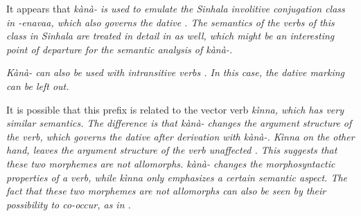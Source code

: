 

It appears that \em kànà- \em is used to emulate the Sinhala involitive conjugation class in \em -enavaa\em, which also governs the dative \citep{Gair1971actioninvolvement}. The semantics of the verbs of this class in Sinhala are treated in detail in \citet{Gair1971actioninvolvement} as well, which might be an interesting point of departure for the semantic analysis of \em kànà-\em.

\em Kànà- \em can also be used with intransitive verbs . In this case, the dative marking can be left out.


It is possible that this prefix is related to the vector verb \em kìnna\em, which has very similar semantics. The difference is that \em kànà- \em changes the argument structure of the verb, which governs the dative after derivation with \em kànà-\em. \em Kìnna \em on the other hand, leaves the argument structure of the verb unaffected . This suggests that these two morphemes are not allomorphs. \em kànà- \em changes the morphosyntactic properties of a verb, while \em kìnna \em only emphasizes a certain semantic aspect. The fact that these two morphemes are not allomorphs can also be seen by their possibility to co-occur, as in .

  


